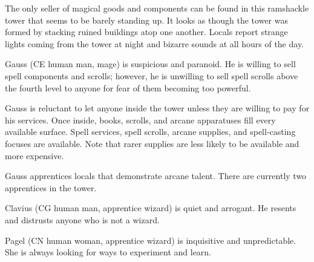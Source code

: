 The only seller of magical goods and components can be found in this ramshackle tower that seems to be barely standing up.
It looks as though the tower was formed by stacking ruined buildings atop one another.
Locals report strange lights coming from the tower at night and bizarre sounds at all hours of the day.

Gauss (CE human man, mage) is suspicious and paranoid.
He is willing to sell spell components and scrolls; however, he is unwilling to sell spell scrolls above the fourth level to anyone for fear of them becoming too powerful.

Gauss is reluctant to let anyone inside the tower unless they are willing to pay for his services.
Once inside, books, scrolls, and arcane apparatuses fill every available surface.
Spell services, spell scrolls, arcane supplies, and spell-casting focuses are available.
Note that rarer supplies are less likely to be available and more expensive.

Gauss apprentices locals that demonstrate arcane talent.
There are currently two apprentices in the tower.

Clavius (CG human man, apprentice wizard) is quiet and arrogant.
He resents and distrusts anyone who is not a wizard.

Pagel (CN human woman, apprentice wizard) is inquisitive and unpredictable.
She is always looking for ways to experiment and learn.

